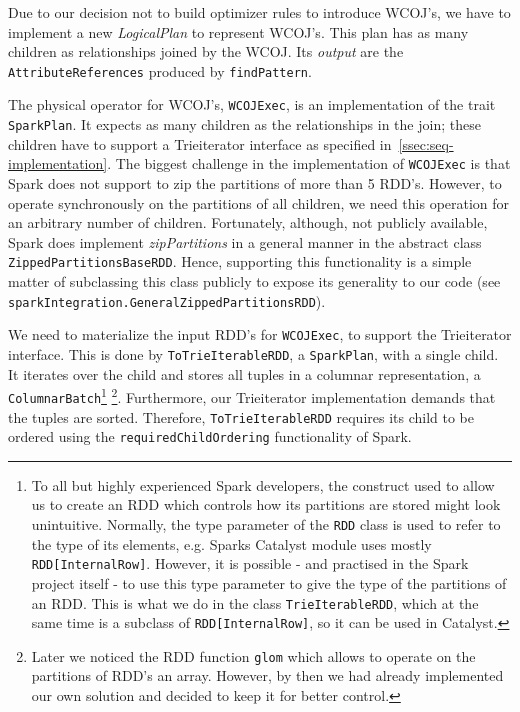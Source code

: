 Due to our decision not to build optimizer rules to introduce WCOJ's, we have to implement a new \textit{LogicalPlan} to represent WCOJ's.
This plan has as many children as relationships joined by the WCOJ.
Its \textit{output} are the \texttt{AttributeReferences} produced by \texttt{findPattern}.

The physical operator for WCOJ's, \texttt{WCOJExec}, is an implementation of the trait \texttt{SparkPlan}.
It expects as many children as the relationships in the join;
these children have to support a Trieiterator interface as specified in~\cref{ssec:seq-implementation}.
The biggest challenge in the implementation of \texttt{WCOJExec} is that Spark does not support to zip the partitions of more than 5 RDD's.
However, to operate synchronously on the partitions of all children, we need this operation for an arbitrary number of children.
Fortunately, although, not publicly available, Spark does implement \textit{zipPartitions} in a general manner in
the abstract class \texttt{ZippedPartitionsBaseRDD}.
Hence, supporting this functionality is a simple matter of subclassing this class publicly to expose its generality to our code (see
\texttt{sparkIntegration.GeneralZippedPartitionsRDD}).

We need to materialize the input RDD's for \texttt{WCOJExec}, to support the Trieiterator interface.
This is done by \texttt{ToTrieIterableRDD}, a \texttt{SparkPlan}, with a single child.
It iterates over the child and stores all tuples in a columnar representation, a \texttt{ColumnarBatch}\footnote{To all but highly
experienced Spark developers, the construct used to allow us to create an RDD which controls how its partitions are stored might look
unintuitive.
Normally, the type parameter of the \texttt{RDD} class is used to refer to the type of its elements, e.g. Sparks Catalyst module uses
mostly \texttt{RDD[InternalRow]}.
However, it is possible - and practised in the Spark project itself - to use this type parameter to give the type of the partitions of an
RDD.
This is what we do in the class \texttt{TrieIterableRDD}, which at the same time is a subclass of \texttt{RDD[InternalRow]}, so it can be
used in Catalyst.}
\footnote{Later we noticed the RDD function \texttt{glom} which allows to operate on the partitions of RDD's an array.
However, by then we had already implemented our own solution and decided to keep it for better control.}.
Furthermore, our Trieiterator implementation demands that the tuples are sorted.
Therefore, \texttt{ToTrieIterableRDD} requires its child to be ordered using the \texttt{requiredChildOrdering} functionality of Spark.

